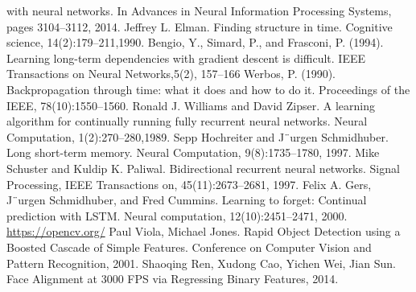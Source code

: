 \documentclass[a4paper, openany, oneside, 11pt]{book}
\begin{document}
\begin{thebibliography}{99}
with neural networks. In Advances in Neural Information Processing Systems,
pages 3104–3112, 2014.
Jeffrey L. Elman. Finding structure in time. Cognitive science, 14(2):179–211,1990.
Bengio, Y., Simard, P., and Frasconi, P. (1994). Learning long-term dependencies with gradient descent is
difficult. IEEE Transactions on Neural Networks,5(2), 157–166
Werbos, P. (1990). Backpropagation through time: what it does and how to do it. Proceedings of the
IEEE, 78(10):1550–1560.
Ronald J. Williams and David Zipser. A learning algorithm for continually running fully recurrent neural networks. Neural Computation, 1(2):270–280,1989.
Sepp Hochreiter and J¨urgen Schmidhuber. Long short-term memory. Neural Computation, 9(8):1735–1780, 1997.
Mike Schuster and Kuldip K. Paliwal. Bidirectional recurrent neural networks.
Signal Processing, IEEE Transactions on, 45(11):2673–2681, 1997.
Felix A. Gers, J¨urgen Schmidhuber, and Fred Cummins. Learning to forget:
Continual prediction with LSTM. Neural computation, 12(10):2451–2471,
2000.
\url{https://opencv.org/}
Paul Viola, Michael Jones. Rapid Object Detection using a Boosted Cascade of Simple Features. Conference on Computer Vision and Pattern Recognition, 2001.
Shaoqing Ren, Xudong Cao, Yichen Wei, Jian Sun. Face Alignment at 3000 FPS via Regressing Binary Features, 2014. 
\end{thebibliography}
\end{document}
